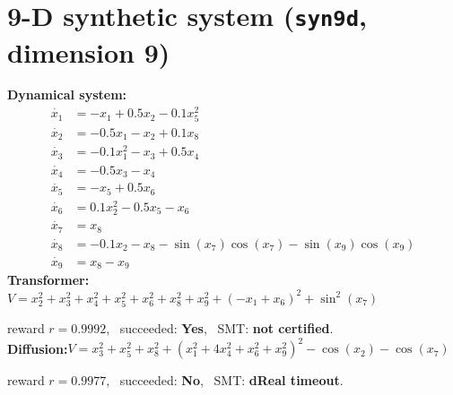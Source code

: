 \documentclass[11pt]{article}
\begin{document}
\section*{9-D synthetic system \quad (\texttt{syn9d}, dimension 9)}
\textbf{Dynamical system:}
\begin{align*}
\dot{x_{1}} &= - x_{1} + 0.5 x_{2} - 0.1 x_{5}^{2} \\
\dot{x_{2}} &= - 0.5 x_{1} - x_{2} + 0.1 x_{8} \\
\dot{x_{3}} &= - 0.1 x_{1}^{2} - x_{3} + 0.5 x_{4} \\
\dot{x_{4}} &= - 0.5 x_{3} - x_{4} \\
\dot{x_{5}} &= - x_{5} + 0.5 x_{6} \\
\dot{x_{6}} &= 0.1 x_{2}^{2} - 0.5 x_{5} - x_{6} \\
\dot{x_{7}} &= x_{8} \\
\dot{x_{8}} &= - 0.1 x_{2} - x_{8} - \sin{\left(x_{7} \right)} \cos{\left(x_{7} \right)} - \sin{\left(x_{9} \right)} \cos{\left(x_{9} \right)} \\
\dot{x_{9}} &= x_{8} - x_{9} 
\end{align*}
\textbf{Transformer:}\quad $V = x_{2}^{2} + x_{3}^{2} + x_{4}^{2} + x_{5}^{2} + x_{6}^{2} + x_{8}^{2} + x_{9}^{2} + \left(- x_{1} + x_{6}\right)^{2} + \sin^{2}{\left(x_{7} \right)}$
\par\noindent\hspace{1em}reward $r=0.9992$, \ succeeded: \textbf{Yes}, \ SMT: \textbf{not certified}.\\[0.5ex]
\textbf{Diffusion:}\quad $V = x_{3}^{2} + x_{5}^{2} + x_{8}^{2} + \left(x_{1}^{2} + 4 x_{4}^{2} + x_{6}^{2} + x_{9}^{2}\right)^{2} - \cos{\left(x_{2} \right)} - \cos{\left(x_{7} \right)}$
\par\noindent\hspace{1em}reward $r=0.9977$, \ succeeded: \textbf{No}, \ SMT: \textbf{dReal timeout}.\\[1ex]
\end{document}
